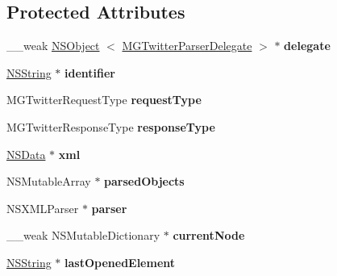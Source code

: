 \subsection*{\-Protected \-Attributes}
\begin{DoxyCompactItemize}
\item 
\hypertarget{interface_m_g_twitter_x_m_l_parser_a5c4fc01ccf65d2bb2974b078918b276c}{
\-\_\-\-\_\-weak \hyperlink{class_n_s_object}{\-N\-S\-Object}\*
$<$ \hyperlink{protocol_m_g_twitter_parser_delegate-p}{\-M\-G\-Twitter\-Parser\-Delegate} $>$ $\ast$ {\bfseries delegate}}
\label{interface_m_g_twitter_x_m_l_parser_a5c4fc01ccf65d2bb2974b078918b276c}

\item 
\hypertarget{interface_m_g_twitter_x_m_l_parser_a5de01bebad909b2d55ac1af29f18ac72}{
\hyperlink{class_n_s_string}{\-N\-S\-String} $\ast$ {\bfseries identifier}}
\label{interface_m_g_twitter_x_m_l_parser_a5de01bebad909b2d55ac1af29f18ac72}

\item 
\hypertarget{interface_m_g_twitter_x_m_l_parser_a9c9e25fd5089b1cee50f1e084834ec19}{
\-M\-G\-Twitter\-Request\-Type {\bfseries request\-Type}}
\label{interface_m_g_twitter_x_m_l_parser_a9c9e25fd5089b1cee50f1e084834ec19}

\item 
\hypertarget{interface_m_g_twitter_x_m_l_parser_a38e30113bec40d7d1ee70585cffb67b2}{
\-M\-G\-Twitter\-Response\-Type {\bfseries response\-Type}}
\label{interface_m_g_twitter_x_m_l_parser_a38e30113bec40d7d1ee70585cffb67b2}

\item 
\hypertarget{interface_m_g_twitter_x_m_l_parser_ac3c376955ec25a036e8f96aa2e9e0c48}{
\hyperlink{class_n_s_data}{\-N\-S\-Data} $\ast$ {\bfseries xml}}
\label{interface_m_g_twitter_x_m_l_parser_ac3c376955ec25a036e8f96aa2e9e0c48}

\item 
\hypertarget{interface_m_g_twitter_x_m_l_parser_abf8287c5c0b56c9a40ede3677ae059af}{
\-N\-S\-Mutable\-Array $\ast$ {\bfseries parsed\-Objects}}
\label{interface_m_g_twitter_x_m_l_parser_abf8287c5c0b56c9a40ede3677ae059af}

\item 
\hypertarget{interface_m_g_twitter_x_m_l_parser_a77557ecd2b06564df8ad525d09f0c0fb}{
\-N\-S\-X\-M\-L\-Parser $\ast$ {\bfseries parser}}
\label{interface_m_g_twitter_x_m_l_parser_a77557ecd2b06564df8ad525d09f0c0fb}

\item 
\hypertarget{interface_m_g_twitter_x_m_l_parser_afb86a6e42c3cecd110eea81735629550}{
\-\_\-\-\_\-weak \-N\-S\-Mutable\-Dictionary $\ast$ {\bfseries current\-Node}}
\label{interface_m_g_twitter_x_m_l_parser_afb86a6e42c3cecd110eea81735629550}

\item 
\hypertarget{interface_m_g_twitter_x_m_l_parser_a5383b7475f70898940273856db6f63f6}{
\hyperlink{class_n_s_string}{\-N\-S\-String} $\ast$ {\bfseries last\-Opened\-Element}}
\label{interface_m_g_twitter_x_m_l_parser_a5383b7475f70898940273856db6f63f6}

\end{DoxyCompactItemize}


